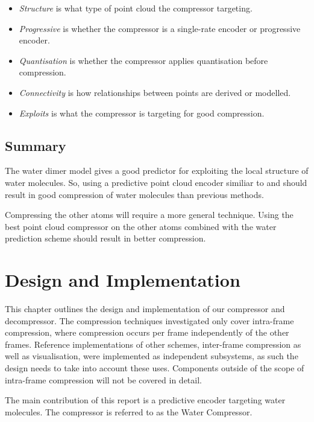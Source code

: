 \documentclass[a4paper]{report}
\begin{document}
\begin{itemize}
\item \emph{Structure} is what type of point cloud the compressor targeting.

\item \emph{Progressive} is whether the compressor is a single-rate encoder or
  progressive encoder.

\item \emph{Quantisation} is whether the compressor applies quantisation
  before compression.

\item \emph{Connectivity} is how relationships between points are derived or
  modelled.

\item \emph{Exploits} is what the compressor is targeting for good
  compression.
\end{itemize}


\section{Summary}

The water dimer model gives a good predictor for exploiting the local
structure of water molecules. So, using a predictive point cloud encoder
similiar to \citet{merrycomp} and \citet{gumholdcomp} should result in good
compression of water molecules than previous methods.

Compressing the other atoms will require a more general technique. Using the
best point cloud compressor on the other atoms combined with the water
prediction scheme should result in better compression.


\chapter{Design and Implementation}

This chapter outlines the design and implementation of our compressor and
decompressor. The compression techniques investigated only cover intra-frame
compression, where compression occurs per frame independently of the other
frames. Reference implementations of other schemes, inter-frame compression as
well as visualisation, were implemented as independent subsystems, as such the
design needs to take into account these uses. Components outside of the scope
of intra-frame compression will not be covered in detail.

The main contribution of this report is a predictive encoder targeting water
molecules. The compressor is referred to as the Water Compressor.
\end{document}
